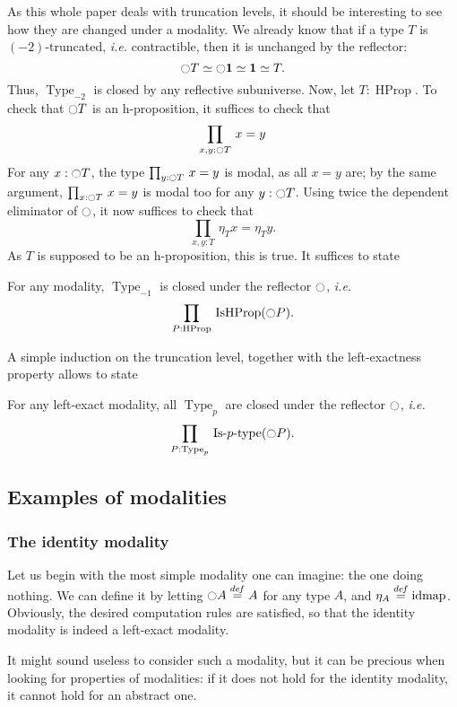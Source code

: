 \documentclass[notfinal]{jfrarticle}
\DeclareMathOperator{\Type}{Type}
\DeclareMathOperator{\HProp}{HProp}
\DeclareMathOperator{\IsHProp}{IsHProp}
\DeclareMathOperator{\idmap}{\mathrm{idmap}}
\newcommand \defeq {\overset{de\hspace{-0.2ex}f}{=}}
\def\mymathhyphen{{\hbox{-}}}
\newcommand{\IsType}[1]
{\mathop{\mathrm{Is\mymathhyphen}#1\mathrm{\mymathhyphen type}} }
\newcommand{\modal}{\ensuremath{\ocircle}}
\newcommand \one {\mathbf{1}}
\newcommand{\prodD}[3]{\prod_{#1:#2}\, #3}
\newcommand{\ie}{\emph{i.e.}}
\begin{document}
As this whole paper deals with truncation levels, it should be
interesting to see how they are changed under a modality. 
We already know that if a type $T$ is $(-2)$-truncated, \ie{}
contractible, then it is unchanged by the reflector: \[\modal T \simeq
\modal \one \simeq \one \simeq T.\] Thus, $\Type_{-2}$ is closed by
any reflective subuniverse.
%
Now, let $T:\HProp$. To check that $\modal T$ is an h-proposition, it
suffices to check that \[\prodD {x,y} {\modal T} {x = y}\] 
For any $x:\modal T$, the type $\prodD y {\modal T} {x = y}$
is modal, as all $x=y$ are; by the same argument, $\prodD x {\modal T} {x =
  y}$ is modal too for any $y:\modal T$. 
Using twice the dependent eliminator of $\modal$, it now suffices to
check that \[\prodD {x,y} T {\eta_T x = \eta_T y}.\]
As $T$ is supposed to be an h-proposition, this is true. It suffices
to state
\begin{lem}\label{lem:mod-hprop}
  For any modality, $\Type_{-1}$ is closed under the reflector
  $\modal$, \ie{} \[\prodD P \HProp {\IsHProp (\modal P)}.\]
\end{lem}

A simple induction on the truncation level, together with the
left-exactness property allows to state
\begin{lem}\label{lem:mod-istrunc}
  For any left-exact modality, all $\Type_p$ are closed under the
  reflector $\modal$, \ie{}
  \[\prodD P {\Type_p} {\IsType p (\modal P)}.\]
\end{lem}




\subsection{Examples of modalities}
\label{ssec:modalities-examples}

\subsubsection{The identity modality}
\label{sssec:id_mod}

Let us begin with the most simple modality one can imagine: the one
doing nothing. We can define it by letting $\modal A \defeq A$ for any type
$A$, and $\eta_A \defeq \idmap$. Obviously, the desired computation
rules are satisfied, so that the identity modality is indeed a
left-exact modality.

It might sound useless to consider such a modality, but it can be
precious when looking for properties of modalities: if it does not
hold for the identity modality, it cannot hold for an abstract one.
\end{document}
